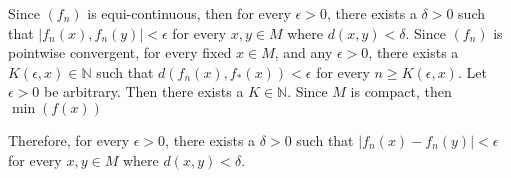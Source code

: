 \documentclass{article}
\newcommand{\N}{\mathbb{N}}
\begin{document}
Since $(f_n)$ is equi-continuous, then for every $\epsilon > 0$, there exists a $\delta > 0$ such that $|f_n(x), f_n(y)| < \epsilon$ for every $x, y \in M$ where $d(x, y) < \delta.$ Since $(f_n)$ is pointwise convergent, for every fixed $x \in M$, and any $\epsilon > 0$, there exists a $K(\epsilon, x) \in \N$ such that $d(f_n(x), f_*(x)) < \epsilon$ for every $n \geq K(\epsilon, x).$ Let $\epsilon > 0$ be arbitrary. Then there exists a $K \in \N$. Since $M$ is compact, then $\min(f(x))$

Therefore, for every $\epsilon > 0$, there exists a $\delta > 0$ such that $|f_n(x) - f_n(y)| < \epsilon$ for every $x, y \in M$ where $d(x, y) < \delta$.
\end{document}
